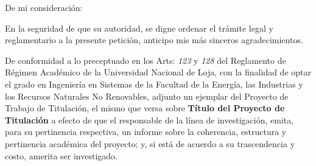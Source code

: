 \documentclass[12pt,a4paper,sans]{moderncv}
\newcommand{\titulo}{Título del Proyecto de Titulación}
\begin{document}
\date{Loja, 24 de agosto del 2020}
\opening{De mi consideración:}
\closing{En la seguridad de que su autoridad, se digne ordenar el trámite legal y reglamentario a la presente petición, anticipo mis más sinceros agradecimientos.}
\makelettertitle

De conformidad a lo preceptuado en los Arts: \textit{123} y \textit{128} del Reglamento de Régimen Académico de la Universidad Nacional de Loja, con la finalidad de optar el grado en Ingeniería en Sistemas de la Facultad de la Energía, las Industrias y los Recursos Naturales No Renovables, adjunto un ejemplar del Proyecto de Trabajo de Titulación, el mismo que versa sobre \textbf{\titulo} a efecto de que el responsable de la línea de investigación, emita, para su pertinencia respectiva, un informe sobre la coherencia, estructura y pertinencia académica del proyecto; y, si está de acuerdo a su trascendencia y costo, amerita ser investigado.

\makeletterclosing
\end{document}
